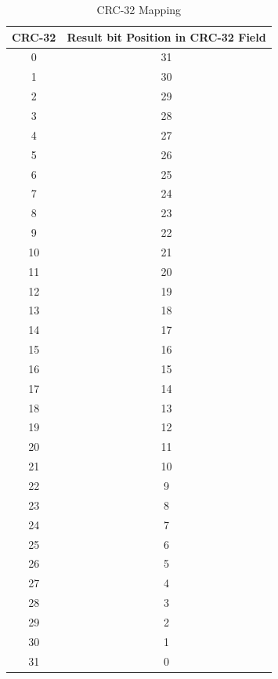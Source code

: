 \begin{table}[H]
    \centering
        \caption{CRC-32 Mapping}
    \begin{tabular}{|c|c|}
        \hline
        \textbf{CRC-32} & \textbf{Result bit Position in CRC-32 Field} \\
        \hline
        0 & 31 \\
        \hline
        1 & 30 \\
        \hline
        2 & 29 \\
        \hline
        3 & 28 \\
        \hline
        4 & 27 \\
        \hline
        5 & 26 \\
        \hline
        6 & 25 \\
        \hline
        7 & 24 \\
        \hline
        8 & 23 \\
        \hline
        9 & 22 \\
        \hline
        10 & 21 \\
        \hline
        11 & 20 \\
        \hline
        12 & 19 \\
        \hline
        13 & 18 \\
        \hline
        14 & 17 \\
        \hline
        15 & 16 \\
        \hline
        16 & 15 \\
        \hline
        17 & 14 \\
        \hline
        18 & 13 \\
        \hline
        19 & 12 \\
        \hline
        20 & 11 \\
        \hline
        21 & 10 \\
        \hline
        22 & 9 \\
        \hline
        23 & 8 \\
        \hline
        24 & 7 \\
        \hline
        25 & 6 \\
        \hline
        26 & 5 \\
        \hline
        27 & 4 \\
        \hline
        28 & 3 \\
        \hline
        29 & 2 \\
        \hline
        30 & 1 \\
        \hline
        31 & 0 \\
        \hline
    \end{tabular}

    \label{tab:crc32_mapping}
\end{table}

